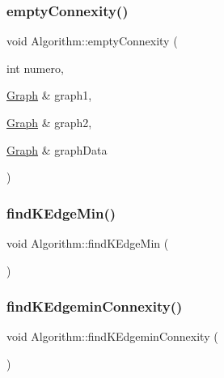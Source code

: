 \mbox{\label{struct_algorithm_a363b2a9d18b83cf776182996ed9b1b91}} 
\subsubsection{\texorpdfstring{empty\+Connexity()}{emptyConnexity()}}
{\footnotesize\ttfamily void Algorithm\+::empty\+Connexity (\begin{DoxyParamCaption}\item[{int}]{numero,  }\item[{\mbox{\hyperlink{class_graph}{Graph}} \&}]{graph1,  }\item[{\mbox{\hyperlink{class_graph}{Graph}} \&}]{graph2,  }\item[{\mbox{\hyperlink{class_graph}{Graph}} \&}]{graph\+Data }\end{DoxyParamCaption})}

\mbox{\label{struct_algorithm_ae0961d8c30105f3ea9db598f2548bdb9}} 
\subsubsection{\texorpdfstring{find\+K\+Edge\+Min()}{findKEdgeMin()}}
{\footnotesize\ttfamily void Algorithm\+::find\+K\+Edge\+Min (\begin{DoxyParamCaption}{ }\end{DoxyParamCaption})}

\mbox{\label{struct_algorithm_aefee9c99eb1f0f26a2bda2021cc5c99e}} 
\subsubsection{\texorpdfstring{find\+K\+Edgemin\+Connexity()}{findKEdgeminConnexity()}}
{\footnotesize\ttfamily void Algorithm\+::find\+K\+Edgemin\+Connexity (\begin{DoxyParamCaption}{ }\end{DoxyParamCaption})}

